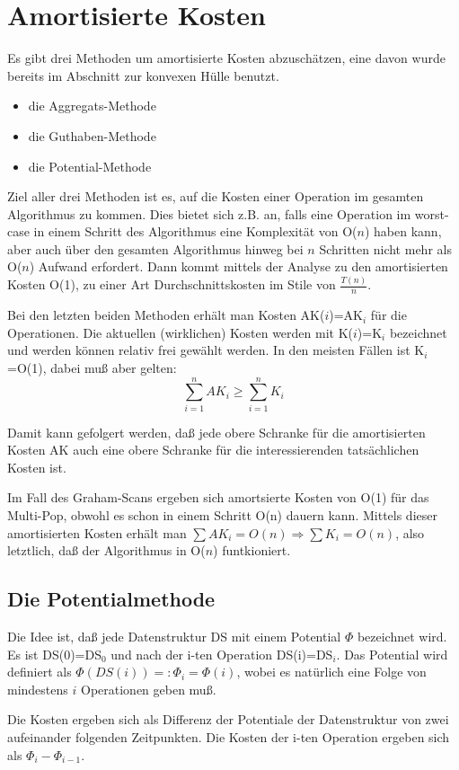 \documentclass[ngerman,draft,parskip=half*,twoside]{scrreprt}
\theoremstyle{break}
\begin{document}
\section{Amortisierte Kosten}
Es gibt drei Methoden um amortisierte Kosten abzuschätzen, eine davon wurde bereits im Abschnitt zur konvexen Hülle
benutzt. 
\begin{itemize}
\item die Aggregats-Methode
\item die Guthaben-Methode
\item die Potential-Methode
\end{itemize} 
Ziel aller drei Methoden ist es, auf die Kosten einer Operation im gesamten Algorithmus zu kommen. Dies bietet sich z.B.
an, falls eine Operation im worst-case in einem Schritt des Algorithmus eine Komplexität von O($n$) haben kann,
aber auch über den gesamten Algorithmus hinweg bei $n$ Schritten nicht mehr als O($n$) Aufwand erfordert. Dann kommt
mittels der Analyse zu den amortisierten Kosten O(1), zu einer Art Durchschnittskosten im Stile von $\frac{T(n)}{n}$.

Bei den letzten beiden Methoden erhält man Kosten AK($i$)=AK$_i$ für die Operationen.
Die aktuellen (wirklichen) Kosten werden
mit K($i$)=K$_i$ bezeichnet und werden können relativ frei gewählt werden. In den meisten Fällen ist K$_i$=O(1),
dabei muß aber gelten:
\[\sum_{i=1}^n AK_i \geq \sum_{i=1}^n K_i\]

Damit kann gefolgert werden, daß jede obere Schranke für die amortisierten Kosten AK auch eine obere Schranke
für die interessierenden tatsächlichen Kosten ist.

Im Fall des Graham-Scans ergeben sich amortsierte Kosten von O(1) für das Multi-Pop, obwohl es schon in einem Schritt
O(n) dauern kann. Mittels dieser amortisierten Kosten erhält man $\sum AK_i=O(n) \Rightarrow \sum K_i=O(n)$, also
letztlich, daß der Algorithmus in O($n$) funtkioniert.

\subsection{Die Potentialmethode}
Die Idee ist, daß jede Datenstruktur DS mit einem Potential $\Phi$ bezeichnet wird. Es ist DS(0)=DS$_0$ und nach der i-ten
Operation DS(i)=DS$_i$. Das Potential wird definiert als $\Phi(DS(i))=:{\Phi}_i=\Phi(i)$, wobei es natürlich
eine Folge von mindestens $i$ Operationen geben muß.

Die Kosten ergeben sich als Differenz der Potentiale der Datenstruktur von zwei aufeinander folgenden Zeitpunkten. Die
Kosten der i-ten Operation ergeben sich als ${\Phi}_i-{\Phi}_{i-1}$.
\end{document}
